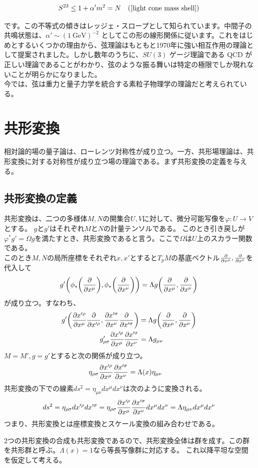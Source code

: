 \documentclass[11pt, dvipdfmx]{article}
\numberwithin{equation}{section}
\newcommand{\blankline}{\par\vspace{\baselineskip}} %
\begin{document}
\begin{align}
S^{23} \le 1 + \alpha' m^2 =N\quad \text{(\eqref{light cone mass shell})}
\end{align}

です。この不等式の傾きはレッジェ・スロープとして知られています。中間子の共鳴状態は、$\alpha' \sim (1\ \text{GeV})^{-2}$ としてこの形の線形関係に従います。これをはじめとするいくつかの理由から、弦理論はもともと1970年に強い相互作用の理論として提案されました。しかし数年のうちに、$SU(3)$ ゲージ理論である QCD が正しい理論であることがわかり、弦のような振る舞いは特定の極限でしか現れないことが明らかになりました。\\
今では、弦は重力と量子力学を統合する素粒子物理学の理論だと考えられている。

\section{共形変換}
相対論的場の量子論は、ローレンツ対称性が成り立つ。一方、共形場理論は、共形変換に対する対称性が成り立つ場の理論である。まず共形変換の定義を与える。
\subsection{共形変換の定義}
共形変換は、二つの多様体$M,N$の開集合$U,V$に対して、微分可能写像を$\varphi: U \to V$とする。
$g$と$g'$はそれぞれ$M$と$N$の計量テンソルである。
このとき引き戻しが$\varphi^* g' = \Omega g$を満たすとき、共形変換であると言う。ここで$\Omega$は$U$上のスカラー関数である。\\
このとき$M,N$の局所座標をそれぞれ$x,x'$とすると$T_pM$の基底ベクトル$\pdv{x^\mu},\pdv{x^\nu}$を代入して\[g'\qty(\phi_*\qty(\pdv{x^\mu}),\phi_*\qty(\pdv{x^\nu})) = \Lambda g\qty(\pdv{x^\mu},\pdv{x^\nu})\]が成り立つ。すなわち、
\begin{align}
    g'\qty(\pdv{x'^\rho}{x^\mu}\pdv{x'^\rho},\pdv{x'^\sigma}{x^\nu}\pdv{x'^\sigma}) &= \Lambda g\qty(\pdv{x^\mu},\pdv{x^\nu})\\
    g'_{\rho\sigma}\pdv{x'^\rho}{x^\mu}\pdv{x'^\sigma}{x^\nu} &= \Lambda g_{\mu\nu}
\end{align}
$M=M',g=g'$とすると次の関係が成り立つ。
\begin{align}
    \eta_{\rho \sigma}\pdv{x'^\rho}{x^\mu}\pdv{x'^\sigma}{x^\nu} &= \Lambda(x) \eta_{\mu\nu}\label{conformal condition}
\end{align}
共形変換の下での線素$ds^2 = \eta_{\mu\nu}dx^\mu dx^\nu$は次のように変換される。
\begin{align}
ds^2= \eta_{\rho \sigma}dx'^\rho dx'^\sigma
= \eta_{\rho \sigma}\pdv{x'^\rho}{x^\mu}\pdv{x'^\sigma}{x^\nu}dx^\mu dx^\nu
= \Lambda \eta_{\mu\nu}dx^\mu dx^\nu
\end{align}
つまり、共形変換とは座標変換とスケール変換の組み合わせである。
\blankline
2つの共形変換の合成も共形変換であるので、共形変換全体は群を成す。この群を共形群と呼ぶ。$\Lambda(x)=1$なら等長写像群に対応する。
これ以降平坦な空間を仮定して考える。
\end{document}
